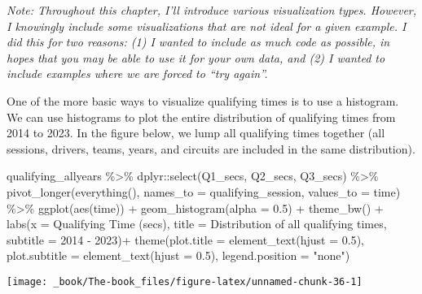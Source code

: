 \documentclass[
]{book}
\newenvironment{Shaded}{\begin{snugshade}}{\end{snugshade}}
\newcommand{\AttributeTok}[1]{\textcolor[rgb]{0.77,0.63,0.00}{#1}}
\newcommand{\FloatTok}[1]{\textcolor[rgb]{0.00,0.00,0.81}{#1}}
\newcommand{\FunctionTok}[1]{\textcolor[rgb]{0.00,0.00,0.00}{#1}}
\newcommand{\NormalTok}[1]{#1}
\newcommand{\SpecialCharTok}[1]{\textcolor[rgb]{0.00,0.00,0.00}{#1}}
\newcommand{\StringTok}[1]{\textcolor[rgb]{0.31,0.60,0.02}{#1}}
\begin{document}
\emph{Note: Throughout this chapter, I'll introduce various visualization types. However, I knowingly include some visualizations that are not ideal for a given example. I did this for two reasons: (1) I wanted to include as much code as possible, in hopes that you may be able to use it for your own data, and (2) I wanted to include examples where we are forced to ``try again''.}

One of the more basic ways to visualize qualifying times is to use a histogram. We can use histograms to plot the entire distribution of qualifying times from 2014 to 2023. In the figure below, we lump all qualifying times together (all sessions, drivers, teams, years, and circuits are included in the same distribution).

\begin{Shaded}
\begin{Highlighting}[]
\NormalTok{qualifying\_allyears }\SpecialCharTok{\%\textgreater{}\%}
\NormalTok{  dplyr}\SpecialCharTok{::}\FunctionTok{select}\NormalTok{(Q1\_secs, Q2\_secs, Q3\_secs) }\SpecialCharTok{\%\textgreater{}\%}
  \FunctionTok{pivot\_longer}\NormalTok{(}\FunctionTok{everything}\NormalTok{(), }\AttributeTok{names\_to =} \StringTok{\textquotesingle{}qualifying\_session\textquotesingle{}}\NormalTok{, }\AttributeTok{values\_to =} \StringTok{\textquotesingle{}time\textquotesingle{}}\NormalTok{) }\SpecialCharTok{\%\textgreater{}\%}
  \FunctionTok{ggplot}\NormalTok{(}\FunctionTok{aes}\NormalTok{(time)) }\SpecialCharTok{+}
  \FunctionTok{geom\_histogram}\NormalTok{(}\AttributeTok{alpha =} \FloatTok{0.5}\NormalTok{) }\SpecialCharTok{+}
  \FunctionTok{theme\_bw}\NormalTok{() }\SpecialCharTok{+}
  \FunctionTok{labs}\NormalTok{(}\AttributeTok{x =} \StringTok{\textquotesingle{}Qualifying Time (secs)\textquotesingle{}}\NormalTok{,}
       \AttributeTok{title =} \StringTok{\textquotesingle{}Distribution of all qualifying times\textquotesingle{}}\NormalTok{,}
       \AttributeTok{subtitle =} \StringTok{\textquotesingle{}2014 {-} 2023\textquotesingle{}}\NormalTok{)}\SpecialCharTok{+}
  \FunctionTok{theme}\NormalTok{(}\AttributeTok{plot.title =} \FunctionTok{element\_text}\NormalTok{(}\AttributeTok{hjust =} \FloatTok{0.5}\NormalTok{),}
        \AttributeTok{plot.subtitle =} \FunctionTok{element\_text}\NormalTok{(}\AttributeTok{hjust =} \FloatTok{0.5}\NormalTok{),}
        \AttributeTok{legend.position =} \StringTok{"none"}\NormalTok{)}
\end{Highlighting}
\end{Shaded}

\begin{center}\texttt{[image: \_book/The-book\_files/figure-latex/unnamed-chunk-36-1]} \end{center}
\end{document}
